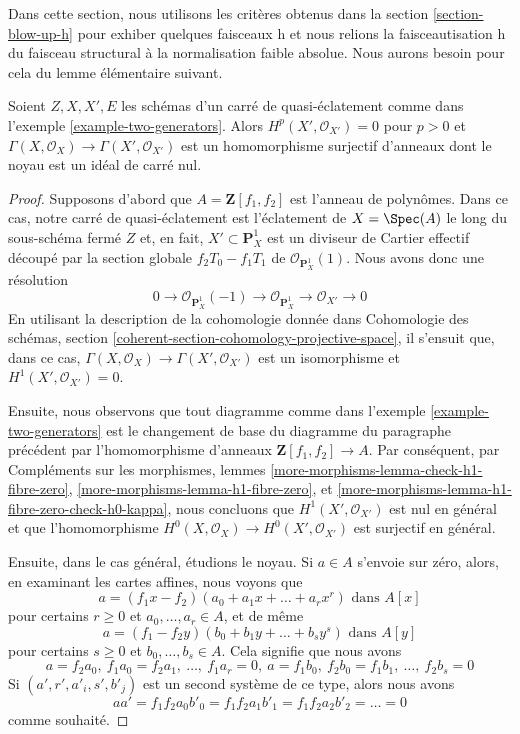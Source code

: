 \noindent
Dans cette section, nous utilisons les critères obtenus dans la
section \ref{section-blow-up-h}
pour exhiber quelques faisceaux h et nous relions la faisceautisation h
du faisceau structural à la normalisation faible absolue.
Nous aurons besoin pour cela du lemme élémentaire suivant.

\begin{lemma}
\label{lemma-funny-blow-up}
Soient $Z, X, X', E$ les schémas d'un carré de quasi-éclatement comme dans
l'exemple \ref{example-two-generators}.
Alors $H^p(X', \mathcal{O}_{X'}) = 0$ pour $p > 0$ et
$\Gamma(X, \mathcal{O}_X) \to \Gamma(X', \mathcal{O}_{X'})$
est un homomorphisme surjectif d'anneaux dont le noyau est un idéal de carré nul.
\end{lemma}

\begin{proof}
Supposons d'abord que $A = \mathbf{Z}[f_1, f_2]$ est l'anneau de polynômes.
Dans ce cas, notre carré de quasi-éclatement est l'éclatement de $X = \Spec(A)$
le long du sous-schéma fermé $Z$ et, en fait, $X' \subset \mathbf{P}^1_X$
est un diviseur de Cartier effectif découpé par la section globale
$f_2T_0 - f_1 T_1$ de $\mathcal{O}_{\mathbf{P}^1_X}(1)$.
Nous avons donc une résolution
$$
0 \to
\mathcal{O}_{\mathbf{P}^1_X}(-1) \to
\mathcal{O}_{\mathbf{P}^1_X} \to
\mathcal{O}_{X'} \to
0
$$
En utilisant la description de la cohomologie donnée dans
Cohomologie des schémas, section
\ref{coherent-section-cohomology-projective-space},
il s'ensuit que, dans ce cas,
$\Gamma(X, \mathcal{O}_X) \to \Gamma(X', \mathcal{O}_{X'})$
est un isomorphisme et $H^1(X', \mathcal{O}_{X'}) = 0$.

\medskip\noindent
Ensuite, nous observons que tout diagramme comme dans l'exemple \ref{example-two-generators}
est le changement de base du diagramme du paragraphe précédent par
l'homomorphisme d'anneaux $\mathbf{Z}[f_1, f_2] \to A$. Par conséquent, par Compléments sur les morphismes, lemmes
\ref{more-morphisms-lemma-check-h1-fibre-zero},
\ref{more-morphisms-lemma-h1-fibre-zero}, et
\ref{more-morphisms-lemma-h1-fibre-zero-check-h0-kappa},
nous concluons que $H^1(X', \mathcal{O}_{X'})$ est nul en général
et que l'homomorphisme
$H^0(X, \mathcal{O}_X) \to H^0(X', \mathcal{O}_{X'})$ est surjectif en général.

\medskip\noindent
Ensuite, dans le cas général, étudions le noyau. Si
$a \in A$ s'envoie sur zéro, alors, en examinant les cartes affines,
nous voyons que
$$
a = (f_1x - f_2)(a_0 + a_1x + \ldots + a_rx^r)\text{ dans }A[x]
$$
pour certains $r \geq 0$ et $a_0, \ldots, a_r \in A$, et de même
$$
a = (f_1 - f_2y)(b_0 + b_1y + \ldots + b_s y^s)\text{ dans }A[y]
$$
pour certains $s \geq 0$ et $b_0, \ldots, b_s \in A$. Cela signifie que nous
avons
$$
a = f_2 a_0,\ f_1 a_0 = f_2 a_1,\ \ldots,\ f_1 a_r = 0,
\ a = f_1 b_0,\ f_2 b_0 = f_1 b_1,\ \ldots,\ f_2 b_s = 0
$$
Si $(a', r', a'_i, s', b'_j)$ est un second système de ce type, alors nous avons
$$
aa' = f_1f_2a_0b'_0 = f_1f_2a_1b'_1 = f_1f_2a_2b'_2 = \ldots = 0
$$
comme souhaité.
\end{proof}

